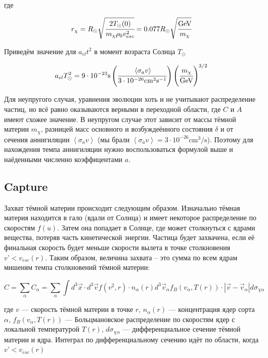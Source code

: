 \documentclass[a4paper, 14pt]{article}
\newcommand{\avarage}[1]{\left\langle #1 \right\rangle}
\begin{document}
где

\begin{equation}
	r_{\chi} = R_{\odot} \sqrt{\cfrac{2 T_{\odot}(0) }{m_{\chi}\rho_0 v_{esc}^2}} =  0.077 R_{\odot} \sqrt{\cfrac{ \text{GeV}}{m_{\chi}}}
\end{equation}

Приведём значение для $a_{el}t^2$ в момент возраста Солнца $T_{\odot}$

\begin{equation}
	a_{el}T_{\odot}^2 = 
	9\cdot10^{-23} \text{s}	\left(\cfrac{   \avarage{\sigma_{a}v}    }{3\cdot10^{-26} \text{cm}^2\text{s}^{-1}} \right)
	\left(\cfrac{m_{\chi}}{\text{GeV}}\right)^{3/2}
\end{equation}

Для неупругого случая, уравнения эволюции хоть и не учитывают распределение частиц, но всё равно оказываются верными в переходной области, где $C$ и $A$ имеют схожее значение. 
В неупругом случае этот зависит от массы тёмной материи $m_{\chi}$, разницей масс основного и возбуждеённого состояния $\delta$ и от сечения аннигиляции $\avarage{\sigma_{a}v}$ (мы брали $\avarage{\sigma_{a}v} = 3\cdot 10^{-26} \text{cm}^3/\text{s}$). Поэтому для нахождения темпа аннигиляции нужно воспользоваться формулой выше и наёденными численно коэффицентами $a$.
	\subsection{Capture}
	

Захват тёмной материи происходит следующим образом. Изначально тёмная материя находится в гало (вдали от Солнца) и имеет некоторое распределение по скоростям $f(u)$. Затем она попадает в Солнце, где может столкнуться с ядрами вещества, потеряв часть кинетической энергии. Частица будет захвачена, если её финальная скорость будет меньше скорости вылета в точке столкновения $v’ < v_{esc}(r)$. Таким образом, величина захвата – это сумма по всем ядрам мишеням темпа столкновений тёмной материи:

\begin{equation}
	\label{eq:Capture_Full}
	C = \sum_{\alpha} C_{\alpha} = \sum_{\alpha} \int{
		d^3\vec{x} \cdot d^3\vec{v} f(v^2,r) \cdot n_{\alpha}(r) 
		d^3\vec{v}_{\alpha} f_B(v_{\alpha},T(r)) \cdot
		|\vec{v}- \vec{v}_{\alpha}| d\sigma_{\chi \alpha}
	}
\end{equation}

где $v$ --- скорость тёмной материи в точке $r$, $n_{\alpha}(r)$ --- концентрация ядер сорта $\alpha$, $f_B(v_{\alpha},T(r))$ --- Больцмановское распределение по скоростям ядер с локальной температурой $T(r)$, $d\sigma_{\chi \alpha}$ --- дифференциальное сечение тёмной материи и ядра. Интеграл по дифференциальному сечению идёт по области, когда $v’ < v_{esc}(r)$
\end{document}
